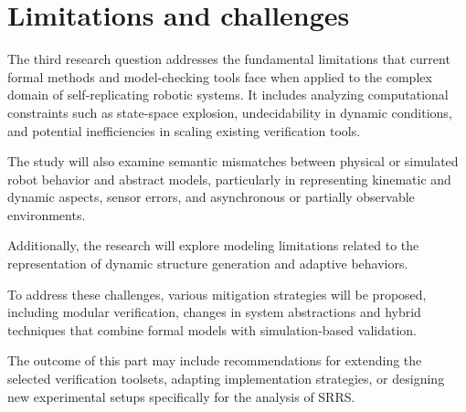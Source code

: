 \section{Limitations and challenges}


The third research question addresses the fundamental limitations that 
current formal methods and model-checking tools face when applied to the 
complex domain of self-replicating robotic systems.
It includes analyzing computational constraints such as state-space explosion, 
undecidability in dynamic conditions, and potential inefficiencies in scaling existing verification tools. 

The study will also examine semantic mismatches between physical 
or simulated robot behavior and abstract models, particularly in representing kinematic 
and dynamic aspects, sensor errors, and asynchronous or partially 
observable environments. 

Additionally, the research will explore modeling limitations related 
to the representation of dynamic structure generation and adaptive behaviors.

To address these challenges, various mitigation strategies will be proposed,
including modular verification, changes in system abstractions  
and hybrid techniques that combine formal models with simulation-based validation. 

The outcome of this part may include recommendations for extending the 
selected verification toolsets, adapting implementation strategies, or designing 
new experimental setups specifically for the analysis of SRRS.



